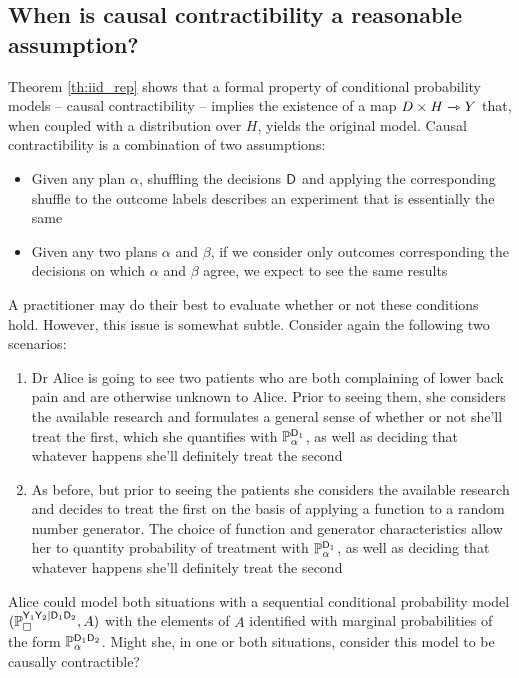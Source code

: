 \subsection{When is causal contractibility a reasonable assumption?}

Theorem \ref{th:iid_rep} shows that a formal property of conditional probability models -- causal contractibility -- implies the existence of a map $D\times H\rightarrowtriangle Y$ that, when coupled with a distribution over $H$, yields the original model. Causal contractibility is a combination of two assumptions:
\begin{itemize}
    \item Given any plan $\alpha$, shuffling the decisions $\mathsf{D}$ and applying the corresponding shuffle to the outcome labels describes an experiment that is essentially the same
    \item Given any two plans $\alpha$ and $\beta$, if we consider only outcomes corresponding the decisions on which $\alpha$ and $\beta$ agree, we expect to see the same results
\end{itemize}

A practitioner may do their best to evaluate whether or not these conditions hold. However, this issue is somewhat subtle. Consider again the following two scenarios:

\begin{enumerate}
    \item Dr Alice is going to see two patients who are both complaining of lower back pain and are otherwise unknown to Alice. Prior to seeing them, she considers the available research and formulates a general sense of whether or not she'll treat the first, which she quantifies with $\mathbb{P}_\alpha^{\mathsf{D}_1}$, as well as deciding that whatever happens she'll definitely treat the second
    \item As before, but prior to seeing the patients she considers the available research and decides to treat the first on the basis of applying a function to a random number generator. The choice of function and generator characteristics allow her to quantity probability of treatment with $\mathbb{P}_\alpha^{\mathsf{D}_1}$, as well as deciding that whatever happens she'll definitely treat the second
\end{enumerate}

Alice could model both situations with a sequential conditional probability model $(\mathbb{P}_\square^{\mathsf{Y}_1\mathsf{Y}_2|\mathsf{D}_1\mathsf{D}_2},A)$ with the elements of $A$ identified with marginal probabilities of the form $\mathbb{P}_\alpha^{\mathsf{D}_1\mathsf{D}_2}$. Might she, in one or both situations, consider this model to be causally contractible?

